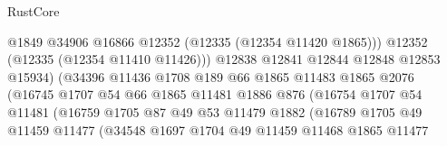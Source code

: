 \begin{lexlean}{RustCore}
\begin{coremodule}
                                          @1849
                                          @34906
                                          @16866
                                          @12352
                                          (@12335 (@12354 @11420 @1865)))
                                        @12352
                                        (@12335 (@12354 @11410 @11426)))
                                      @12838
                                      @12841
                                      @12844
                                      @12848
                                      @12853
                                      @15934)
                                    (@34396
                                      @11436
                                      @1708
                                      @189
                                      @66
                                      @1865
                                      @11483
                                      @1865
                                      @2076
                                      (@16745
                                        @1707
                                        @54
                                        @66
                                        @1865
                                        @11481
                                        @1886
                                        @876
                                        (@16754
                                          @1707
                                          @54
                                          @11481
                                          (@16759
                                            @1705
                                            @87
                                            @49
                                            @53
                                            @11479
                                            @1882
                                            (@16789
                                              @1705
                                              @49
                                              @11459
                                              @11477
                                              (@34548
                                                @1697
                                                @1704
                                                @49
                                                @11459
                                                @11468
                                                @1865
                                                @11477

\end{coremodule}
\end{lexlean}
